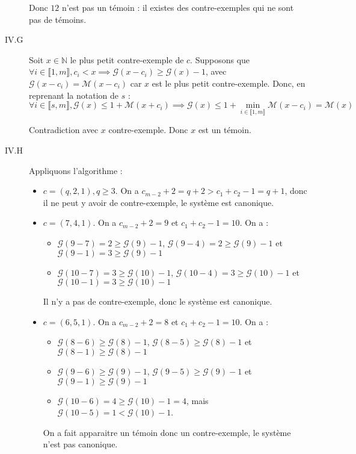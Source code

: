 \documentclass{article}
\newcommand{\N}{\mathbb{N}}
\newcommand{\M}{\mathscr{M}}
\newcommand{\G}{\mathscr{G}}
\newcommand{\seg}[2]{\llbracket #1, #2 \rrbracket}
\begin{document}
\begin{description}
        Donc $12$ n'est pas un témoin : il existes des contre-exemples qui ne sont pas de témoins.

    \item[IV.G] Soit $x\in\N$ le plus petit contre-exemple de $c$. Supposons que $\forall i\in\seg{1}{m}, c_i < x \implies \G(x-c_i) \geq \G(x) - 1$, avec $\G(x-c_i) = \M(x-c_i)$ car $x$ est le plus petit contre-exemple. Donc, en reprenant la notation de $s$ :
        \[ \forall i\in\seg{s}{m}, \G(x) \leq 1 + \M(x + c_i)
            \implies \G(x) \leq 1 + \underset{i\in\seg{1}{m}}{\min} \M(x-c_i) = \M(x) \]

        Contradiction avec $x$ contre-exemple. Donc $x$ est un témoin.

    \item[IV.H] Appliquons l'algorithme :\begin{itemize}
            \item $c = (q,2,1), q \geq 3$. On a $c_{m-2} + 2 = q + 2 > c_1 + c_2 - 1 = q + 1$, donc il ne peut y avoir de contre-exemple, le système est canonique.
            \item $c = (7,4,1)$. On a $c_{m-2} + 2 = 9$ et $c_1 + c_2 - 1 = 10$. On a :\begin{itemize}
                    \item $\G(9-7) = 2 \geq \G(9) - 1$, $\G(9-4) = 2 \geq \G(9) - 1$ et $\G(9-1) = 3 \geq \G(9) - 1$
                    \item $\G(10-7) = 3 \geq \G(10) - 1$, $\G(10-4) = 3\geq \G(10) - 1$ et $\G(10-1) = 3 \geq \G(10) - 1$
                \end{itemize}
                Il n'y a pas de contre-exemple, donc le système est canonique.
            \item $c = (6, 5, 1)$. On a $c_{m-2} + 2 = 8$ et $c_1 + c_2 - 1 = 10$. On a :
                \begin{itemize}
                    \item $\G(8 - 6) \geq \G(8) - 1$, $\G(8 - 5) \geq \G(8) - 1$ et $\G(8 - 1) \geq \G(8) - 1$
                    \item $\G(9 - 6) \geq \G(9) - 1$, $\G(9 - 5) \geq \G(9) - 1$ et $\G(9 - 1) \geq \G(9) - 1$
                    \item $\G(10 - 6) = 4 \geq \G(10) - 1 = 4$, mais $\G(10 - 5) = 1 < \G(10) - 1$.
                \end{itemize}
                On a fait apparaitre un témoin donc un contre-exemple, le système n'est pas canonique.
        \end{itemize}


\end{description}
\end{document}
